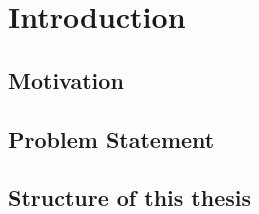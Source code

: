\chapter{Introduction}
\label{chapter:Introduction}

\section{Motivation}

\section{Problem Statement}

\section{Structure of this thesis}
